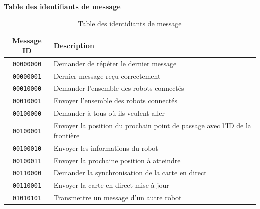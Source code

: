\documentclass[aspectratio=169,10pt]{beamer}
\begin{document}
\begin{frame}{\textbf{Table des identifiants de message}}
	\begin{table}[H]
		\centering
		\begin{tabular}{c l}
			\hline
			\textbf{Message ID} & \textbf{Description} \\
			\hline
			\texttt{00000000} & Demander de répéter le dernier message\\
			\texttt{00000001} & Dernier message reçu correctement\\[5pt]

			\texttt{00010000} & Demander l'ensemble des robots connectés\\
			\texttt{00010001} & Envoyer l'ensemble des robots connectés\\[5pt]

			\texttt{00100000} & Demander à tous où ils veulent aller\\
			\texttt{00100001} & Envoyer la position du prochain point de passage avec l'ID de la frontière\\
			\texttt{00100010} & Envoyer les informations du robot\\
			\texttt{00100011} & Envoyer la prochaine position à atteindre\\[5pt]

			\texttt{00110000} & Demander la synchronisation de la carte en direct\\
			\texttt{00110001} & Envoyer la carte en direct mise à jour\\[5pt]

			\texttt{01010101} & Transmettre un message d'un autre robot\\
			\hline
		\end{tabular}
		\caption{Table des identidiants de message}
	\end{table}
\end{frame}
\end{document}
